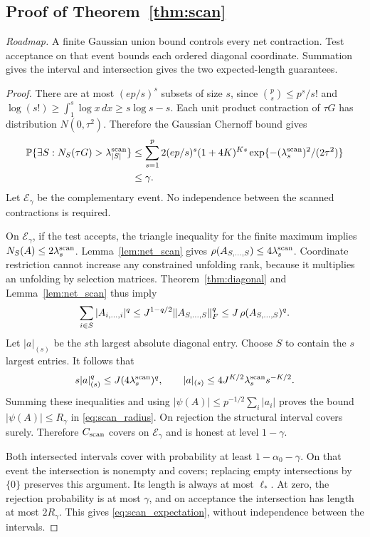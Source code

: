 \subsection{Proof of Theorem~\ref{thm:scan}}
\noindent\emph{Roadmap.} A finite Gaussian union bound controls every net contraction. Test acceptance on that event bounds each ordered diagonal coordinate. Summation gives the interval and intersection gives the two expected-length guarantees.
\begin{proof}
There are at most $(ep/s)^s$ subsets of size $s$, since
$\binom ps\le p^s/s!$ and
$\log(s!)\ge\int_1^s\log x\,dx\ge s\log s-s$.
Each unit product contraction of $\tau G$ has distribution $N(0,\tau^2)$. Therefore the Gaussian Chernoff bound gives
\begin{align*}
 \mathbb P\{\exists S:N_S(\tau G)>\lambda_{|S|}^{\rm scan}\}
 &\le\sum_{s=1}^p
 2(ep/s)^s(1+4K)^{Ks}
     \exp\{-(\lambda_s^{\rm scan})^2/(2\tau^2)\}\\
 &\le\gamma.
\end{align*}
Let $\mathcal E_\gamma$ be the complementary event. No independence between the scanned contractions is required.

On $\mathcal E_\gamma$, if the test accepts, the triangle inequality for the finite maximum implies $N_S(A)\le2\lambda_s^{\rm scan}$. Lemma~\ref{lem:net_scan} gives $\rho(A_{S,\ldots,S})\le4\lambda_s^{\rm scan}$. Coordinate restriction cannot increase any constrained unfolding rank, because it multiplies an unfolding by selection matrices. Theorem~\ref{thm:diagonal} and Lemma~\ref{lem:net_scan} thus imply
\[
 \sum_{i\in S}|A_{i,\ldots,i}|^q
 \le J^{1-q/2}\lVert A_{S,\ldots,S}\rVert_F^q
 \le J\,\rho(A_{S,\ldots,S})^q.
\]
Let $|a|_{(s)}$ be the $s$th largest absolute diagonal entry. Choose $S$ to contain the $s$ largest entries. It follows that
\[
 s|a|_{(s)}^q\le J(4\lambda_s^{\rm scan})^q,
 \qquad
 |a|_{(s)}\le4J^{K/2}\lambda_s^{\rm scan}s^{-K/2}.
\]
Summing these inequalities and using
$|\psi(A)|\le p^{-1/2}\sum_i|a_i|$
proves the bound $|\psi(A)|\le R_\gamma$ in \eqref{eq:scan_radius}. On rejection the structural interval covers surely. Therefore $C_{\rm scan}$ covers on $\mathcal E_\gamma$ and is honest at level $1-\gamma$.

Both intersected intervals cover with probability at least $1-\alpha_0-\gamma$. On that event the intersection is nonempty and covers; replacing empty intersections by $\{0\}$ preserves this argument. Its length is always at most $\ell_*$. At zero, the rejection probability is at most $\gamma$, and on acceptance the intersection has length at most $2R_\gamma$. This gives \eqref{eq:scan_expectation}, without independence between the intervals.


\end{proof}
